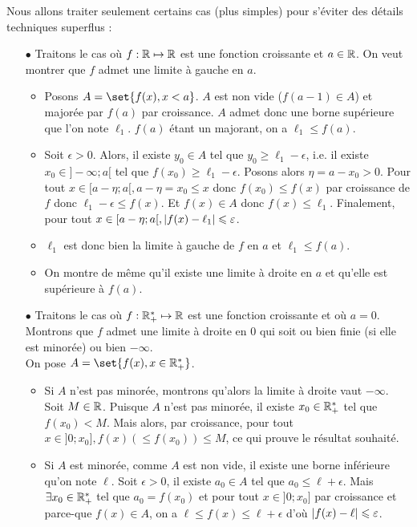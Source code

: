 \documentclass{magnolia}
\begin{document}
\begin{preuve}
Nous allons traiter seulement certains cas (plus simples) pour s'éviter des détails techniques superflus :
\begin{itemize}
\item[$\bullet$] Traitons le cas où $f:\mathbb{R}\mapsto \mathbb{R}$ est une fonction croissante et $a\in \mathbb{R}$. On veut montrer que $f$ admet une limite à gauche en $a$.
\begin{itemize}
\item Posons $A=\set{f(x), x<a}$. $A$ est non vide ($f(a-1)\in A$) et majorée par $f(a)$ par croissance. $A$ admet donc une borne supérieure que l'on note $\ell_1$. $f(a)$ étant un majorant, on a $\ell_1\leq f(a)$.
\item Soit $\epsilon>0$. Alors, il existe $y_0\in A$ tel que $y_0\geq \ell_1-\epsilon$, i.e. il existe $x_0\in ]-\infty;a[$ tel que $f(x_0)\geq \ell_1-\epsilon$. Posons alors $\eta=a-x_0>0$. Pour tout $x\in [a-\eta;a[, a-\eta=x_0\leq x$ donc $f(x_0)\leq f(x)$ par croissance de $f$ donc $\ell_1-\epsilon\leq f(x)$. Et $f(x)\in A$ donc $f(x)\leq \ell_1$. Finalement, pour tout $x\in [a-\eta;a[, \left|f(x)-\ell_1\right|\leqslant \varepsilon$.\\
\item $\ell_1$ est donc bien la limite à gauche de $f$ en $a$ et $\ell_1\leq f(a)$.
\item On montre de même qu'il existe une limite à droite en $a$ et qu'elle est supérieure à $f(a)$.
\end{itemize}
\item[$\bullet$] Traitons le cas où $f:\mathbb{R}_+^*\mapsto \mathbb{R}$ est une fonction croissante et où $a=0$. Montrons que $f$ admet une limite à droite en $0$ qui soit ou bien finie (si elle est minorée) ou bien $-\infty$.\\
On pose $A=\set{f(x), x\in \RPs}$.
\begin{itemize}
\item Si $A$ n'est pas minorée, montrons qu'alors la limite à droite vaut $-\infty$. Soit $M\in \mathbb{R}$. Puisque $A$ n'est pas minorée, il existe $x_0\in \mathbb{R}_+^*$ tel que $f(x_0)<M$. Mais alors, par croissance, pour tout $x\in ]0;x_0], f(x)(\leq f(x_0))\leq M$, ce qui prouve le résultat souhaité.
\item Si $A$ est minorée, comme $A$ est non vide, il existe une borne inférieure qu'on note $\ell$. Soit $\epsilon>0$, il existe $a_0\in A$ tel que $ a_0 \leq \ell+\epsilon$. Mais $\exists x_0\in \mathbb{R}_+^*$ tel que $a_0=f(x_0)$ et pour tout $x\in ]0;x_0]$ par croissance et parce-que $f(x)\in A$, on a $\ell \leq f(x) \leq \ell+\epsilon$ d'où $\left|f(x)-\ell\right|\leqslant \varepsilon$.
\end{itemize}
\end{itemize}
\end{preuve}
\end{document}
